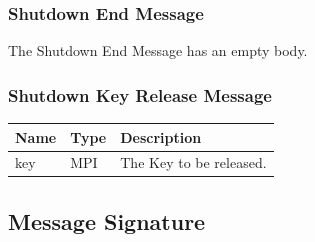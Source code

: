 \documentclass[12pt,titlepage,a4paper]{article}
\begin{document}
\subsubsection{Shutdown End Message}
The Shutdown End Message has an empty body.

\subsubsection{Shutdown Key Release Message}
\begin{tabular}{l l l}
Name        & Type      & Description \\
\hline
key         & MPI       & The Key to be released. \\
\end{tabular}

\subsection{Message Signature}




\end{document}
